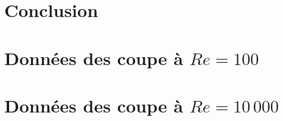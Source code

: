 \documentclass[12pt, letterpaper]{article}
\begin{document}
\section{Conclusion}
	

\newpage

\appendix

\section{Données des coupe à $Re=100$}
	

\section{Données des coupe à $Re=10\,000$}
	

\end{document}
